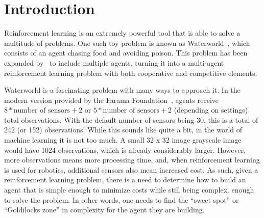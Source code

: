 \section{Introduction}\label{sec:introduction}
Reinforcement learning is an extremely powerful tool that is able to solve a multitude
of problems.
One such toy problem is known as Waterworld~\cite{Karpathy2015, Ho2016}, which consists
of an agent chasing food and avoiding poison.
This problem has been expanded by~\cite{Gupta2017} to include multiple agents,
turning it into a multi-agent reinforcement learning problem with both cooperative
and competitive elements.

Waterworld is a fascinating problem with many ways to approach it.
In the modern version provided by the Farama Foundation~\cite{WaterworldDocumentation},
agents receive $8 * \text{number of sensors} + 2$ or
$5 * \text{number of sensors} + 2$ (depending on settings) total observations.
With the default number of sensors being 30, this is a total of 242 (or 152)
observations!
While this sounds like quite a bit, in the world of machine learning it is not too
much.
A small 32 x 32 image grayscale image would have 1024 observations, which is already
considerably larger.
However, more observations means more processing time, and, when reinforcement
learning is used for robotics, additional sensors also mean increased cost.
As such, given a reinforcement learning problem, there is a need to determine how to
build an agent that is simple enough to minimize costs while still being complex.
enough to solve the problem.
In other words, one needs to find the ``sweet spot'' or ``Goldilocks zone'' in
complexity for the agent they are building.
